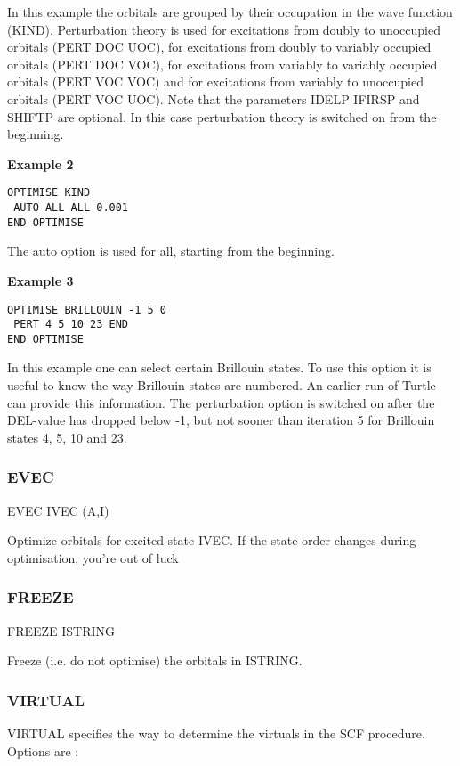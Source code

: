 \documentclass[11pt,fleqn]{article}
\begin{document}
In this example the orbitals are grouped by their occupation in the wave function (KIND). 
Perturbation theory is used for excitations from doubly to unoccupied orbitals (PERT DOC UOC), for excitations
from doubly to variably occupied orbitals (PERT DOC VOC), for excitations from variably to variably
occupied orbitals (PERT VOC VOC) and for excitations from variably to unoccupied orbitals (PERT VOC UOC).
Note that the parameters IDELP IFIRSP and SHIFTP are optional. In this case perturbation theory is switched
on from the beginning.

{\bf Example 2}
\begin{verbatim}
OPTIMISE KIND
 AUTO ALL ALL 0.001
END OPTIMISE
\end{verbatim}

The auto option is used for all, starting from the beginning.


{\bf Example 3}
\begin{verbatim}
OPTIMISE BRILLOUIN -1 5 0
 PERT 4 5 10 23 END
END OPTIMISE
\end{verbatim}

In this example one can select certain Brillouin states. To use this option it is useful to know the way Brillouin
states are numbered. An earlier run of Turtle can provide this information. The perturbation option is switched
on after the DEL-value has dropped below -1, but not sooner than iteration 5 for Brillouin states 4, 5, 10 and 23.


\subsubsection{EVEC}


EVEC IVEC (A,I)

Optimize orbitals for excited state IVEC. 
If the state order changes during optimisation, you're out of luck

\subsubsection{FREEZE}
 
FREEZE ISTRING

Freeze (i.e. do not optimise) the orbitals in ISTRING.

\subsubsection{VIRTUAL} 

VIRTUAL specifies the way to determine the virtuals in the SCF procedure.
Options are :
\end{document}
